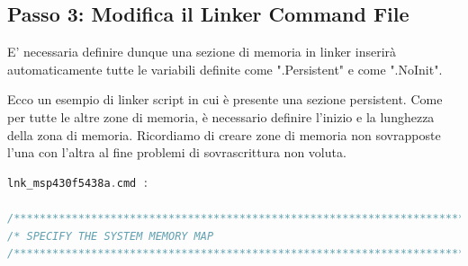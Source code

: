 \documentclass[LaM,binding=0.6cm]{../sapthesis}
\begin{document}
\subsection{Passo 3: Modifica il Linker Command File}
E' necessaria definire dunque una sezione di memoria in linker inserirà automaticamente tutte le variabili definite come ".Persistent" e come ".NoInit".

Ecco un esempio di linker script in cui è presente una sezione persistent.
Come per tutte le altre zone di memoria, è necessario definire l'inizio e la lunghezza della zona di memoria. Ricordiamo 
di creare zone di memoria non sovrapposte l'una con l'altra al fine problemi di sovrascrittura non voluta.

\begin{lstlisting}[language=C]
    lnk_msp430f5438a.cmd :
    
/****************************************************************************/
/* SPECIFY THE SYSTEM MEMORY MAP                                            */
/****************************************************************************/


\end{lstlisting}
\end{document}
